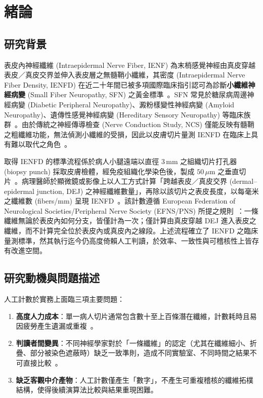 
\chapter{緒論}
\label{chap:introduction}

\section{研究背景}
\label{sec:background}

表皮內神經纖維 (Intraepidermal Nerve Fiber, IENF) 為末梢感覺神經由真皮穿越表皮／真皮交界並伸入表皮層之無髓鞘小纖維，其密度 (Intraepidermal Nerve Fiber Density, IENFD) 在近二十年間已被多項國際臨床指引認可為診斷\textbf{小纖維神經病變} (Small Fiber Neuropathy, SFN) 之黃金標準~\cite{lauria2010skinbiopsy}。SFN 常見於糖尿病周邊神經病變 (Diabetic Peripheral Neuropathy)、澱粉樣變性神經病變 (Amyloid Neuropathy)、遺傳性感覺神經病變 (Hereditary Sensory Neuropathy) 等臨床族群~\cite{furia2025small}。由於傳統之神經傳導檢查 (Nerve Conduction Study, NCS) 僅能反映有髓鞘之粗纖維功能，無法偵測小纖維的受損，因此以皮膚切片量測 IENFD 在臨床上具有難以取代之角色~\cite{raicher2022investigation}。

取得 IENFD 的標準流程係於病人小腿遠端以直徑 $3\,\text{mm}$ 之組織切片打孔器 (biopsy punch) 採取皮膚檢體，經免疫組織化學染色後，製成 $50\,\mu\text{m}$ 之垂直切片~\cite{lauria2010skinbiopsy, raicher2022investigation}。病理醫師於顯微鏡或影像上以人工方式計算「跨越表皮／真皮交界 (dermal–epidermal junction, DEJ) 之神經纖維數量」，再除以該切片之表皮長度，以每毫米之纖維數 (fibers/mm) 呈現 IENFD~\cite{lauria2010skinbiopsy, raicher2022investigation}。該計數遵循 European Federation of Neurological Societies/Peripheral Nerve Society (EFNS/PNS) 所提之規則~\cite{lauria2010skinbiopsy}：一條纖維無論於表皮內如何分支，皆僅計為一次；僅計算由真皮穿越 DEJ 進入表皮之纖維，而不計算完全位於表皮內或真皮內之線段。上述流程確立了 IENFD 之臨床量測標準，然其執行迄今仍高度倚賴人工判讀，於效率、一致性與可稽核性上皆存有改進空間。

\section{研究動機與問題描述}
\label{sec:motivation}

人工計數於實務上面臨三項主要問題：

\begin{enumerate}
  \item \textbf{高度人力成本}：單一病人切片通常包含數十至上百條潛在纖維，計數耗時且易因疲勞產生遺漏或重複~\cite{corra2021advantages}。
  \item \textbf{判讀者間變異}：不同神經學家對於「一條纖維」的認定（尤其在纖維細小、折疊、部分被染色遮蔽時）缺乏一致準則，造成不同實驗室、不同時間之結果不可直接比較~\cite{corra2021advantages}。
  \item \textbf{缺乏客觀中介產物}：人工計數僅產生「數字」，不產生可重複稽核的纖維拓樸結構，使得後續演算法比較與結果重現困難。
\end{enumerate}

